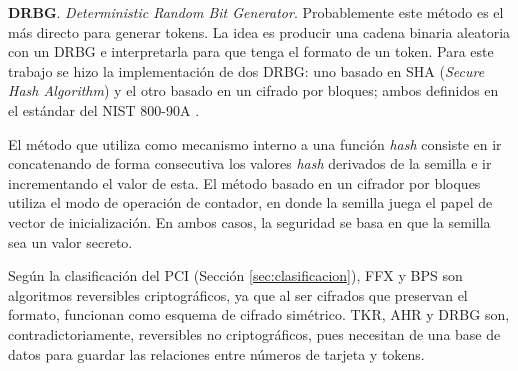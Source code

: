 \textbf{DRBG}. \textit{Deterministic Random Bit Generator}. Probablemente este
método es el más directo para generar tokens. La idea es producir una cadena
binaria aleatoria con un DRBG e interpretarla para que tenga el formato de un
token. Para este trabajo se hizo la implementación de dos DRBG: uno basado en
SHA (\textit{Secure Hash Algorithm}) y el otro basado en un cifrado por
bloques; ambos definidos en el estándar del NIST 800-90A \cite{nist_aleatorios}.

El método que utiliza como mecanismo interno a una función \textit{hash}
consiste en ir concatenando de forma consecutiva los valores \textit{hash}
derivados de la semilla e ir incrementando el valor de esta. El método basado en
un cifrador por bloques utiliza el modo de operación de contador, en donde la
semilla juega el papel de vector de inicialización. En ambos casos, la seguridad
se basa en que la semilla sea un valor secreto.

Según la clasificación del PCI (Sección \ref{sec:clasificacion}), FFX y BPS son
algoritmos reversibles criptográficos, ya que al ser cifrados que preservan el
formato, funcionan como esquema de cifrado simétrico. TKR, AHR y DRBG son,
contradictoriamente, reversibles no criptográficos, pues necesitan de una base
de datos para guardar las relaciones entre números de tarjeta y tokens.


